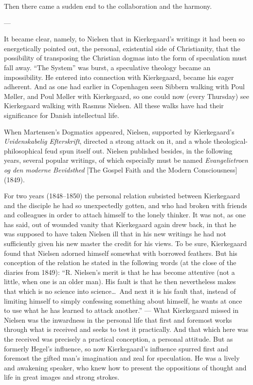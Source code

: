 \documentclass[12pt,a4paper]{book}
\newcommand{\opage}[1]{\marginnote{\footnotesize\textit{[#1]}}}
\begin{document}
Then there came a sudden end to the collaboration and the harmony.

\begin{center}---\end{center}

\opage{187}It became clear, namely, to Nielsen that in Kierkegaard's writings it had been so energetically
pointed out, the personal, existential side of Christianity, that the possibility of
transposing the Christian dogmas into the form of speculation must fall away. ``The System''
was burst, a speculative theology became an impossibility. He entered into connection with
Kierkegaard, became his eager adherent. And as one had earlier in Copenhagen seen Sibbern
walking with Poul Møller, and Poul Møller with Kierkegaard, so one could now (every Thursday)
see Kierkegaard walking with Rasmus Nielsen. All these walks have had their significance for
Danish intellectual life.

When Martensen's Dogmatics appeared, Nielsen, supported by Kierkegaard's \emph{Uvidenskabelig
Efterskrift}, directed a strong attack on it, and a whole theological-philosophical feud spun
itself out. Nielsen published besides, in the following years, several popular writings, of
which especially must be named \emph{Evangelietroen og den moderne Bevidsthed} [The Gospel
Faith and the Modern Consciousness] (1849).

For two years (1848--1850) the personal relation subsisted between Kierkegaard and the disciple
he had so unexpectedly gotten, and who had broken with friends and colleagues in order to
attach himself to the lonely thinker. It was not, as one has said, out of wounded vanity that
Kierkegaard again drew back, in that he was supposed to have taken Nielsen ill that in his new
writings he had not sufficiently given his new master the credit for his views. To be sure,
Kierkegaard found that Nielsen adorned himself somewhat with borrowed feathers. But his
conception of the relation he stated in the following words (at the close of the diaries from
1849): ``R. Nielsen's merit is that he has become attentive (not a little, when one is an older
man). His fault is that he then nevertheless makes that which is no science into science\ldots\
And next it is his fault that, instead of limiting himself to simply confessing something about
himself, he wants at once to use what he has learned to attack another.'' --- What Kierkegaard
missed in Nielsen was the inwardness in the personal life that first and foremost works through
what is received and seeks to test it practically. And that which here was the \opage{188}received was
precisely a practical conception, a personal attitude. But as formerly Hegel's influence, so
now Kierkegaard's influence spurred first and foremost the gifted man's imagination and zeal
for speculation. He was a lively and awakening speaker, who knew how to present the oppositions
of thought and life in great images and strong strokes.
\end{document}

